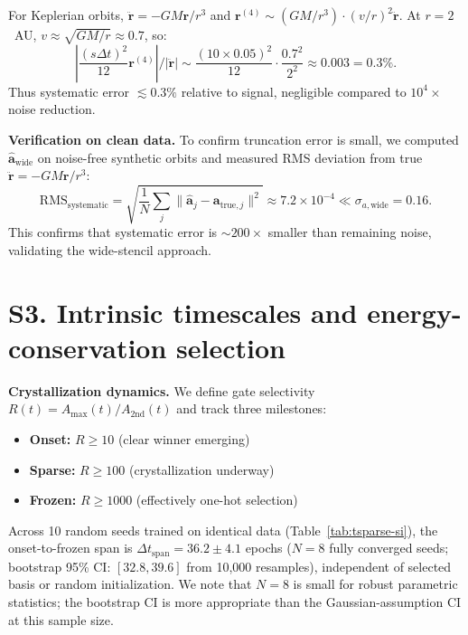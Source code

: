 \documentclass[aps,pre,reprint,superscriptaddress]{revtex4-2}
\begin{document}
For Keplerian orbits, $\ddot{\mathbf{r}} = -GM\mathbf{r}/r^3$ and $\mathbf{r}^{(4)} \sim (GM/r^3) \cdot (v/r)^2 \ddot{\mathbf{r}}$. At $r = 2$~AU, $v \approx \sqrt{GM/r} \approx 0.7$, so:
\begin{equation}
\left|\frac{(s\Delta t)^2}{12} \mathbf{r}^{(4)}\right| / |\ddot{\mathbf{r}}| \sim \frac{(10 \times 0.05)^2}{12} \cdot \frac{0.7^2}{2^2} \approx 0.003 = 0.3\%.
\end{equation}
Thus systematic error $\lesssim 0.3\%$ relative to signal, negligible compared to $10^4\times$ noise reduction.

\textbf{Verification on clean data.} To confirm truncation error is small, we computed $\hat{\mathbf{a}}_{\text{wide}}$ on noise-free synthetic orbits and measured RMS deviation from true $\ddot{\mathbf{r}} = -GM\mathbf{r}/r^3$:
\begin{equation}
\text{RMS}_{\text{systematic}} = \sqrt{\frac{1}{N}\sum_j \|\hat{\mathbf{a}}_j - \mathbf{a}_{\text{true},j}\|^2} \approx 7.2 \times 10^{-4} \ll \sigma_{a,\text{wide}} = 0.16.
\end{equation}
This confirms that systematic error is $\sim 200\times$ smaller than remaining noise, validating the wide-stencil approach.

\section{S3. Intrinsic timescales and energy-conservation selection}
\textbf{Crystallization dynamics.} We define gate selectivity $R(t) = A_{\max}(t) / A_{\text{2nd}}(t)$ and track three milestones:
\begin{itemize}
\item \textbf{Onset:} $R \geq 10$ (clear winner emerging)
\item \textbf{Sparse:} $R \geq 100$ (crystallization underway)
\item \textbf{Frozen:} $R \geq 1000$ (effectively one-hot selection)
\end{itemize}

Across 10 random seeds trained on identical data (Table~\ref{tab:tsparse-si}), the onset-to-frozen span is $\Delta t_{\text{span}} = 36.2 \pm 4.1$ epochs ($N = 8$ fully converged seeds; bootstrap 95\% CI: $[32.8, 39.6]$ from 10{,}000 resamples), independent of selected basis or random initialization. We note that $N=8$ is small for robust parametric statistics; the bootstrap CI is more appropriate than the Gaussian-assumption CI at this sample size.
\end{document}
